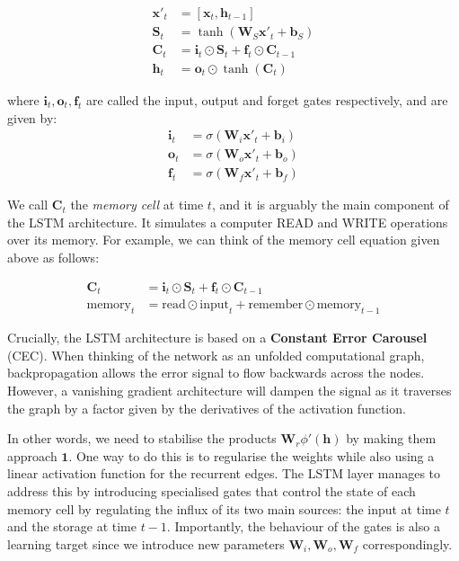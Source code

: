 \documentclass[pdftex,11pt,a4paper]{article}
\theoremstyle{definition}
\theoremstyle{remark}
\newcommand*{\V}[1]{\mathbf{#1}}%
\begin{document}
\begin{align*}
    \V{x}'_t &= [ \V{x}_t, \V{h}_{t-1} ]\\
    \V{S}_t &= \tanh(\V{W}_S\V{x}'_t + \V{b}_S)\\
    \V{C}_t &= \V{i}_t\odot\V{S}_t + \V{f}_t\odot\V{C}_{t-1}\\
    \V{h}_t &= \V{o}_t \odot \tanh(\V{C}_t)
\end{align*}
\par where $\V{i}_t, \V{o}_t, \V{f}_t$ are called the input, output and forget gates respectively, and are given by:
\begin{align*}
    \V{i}_t &= \sigma(\V{W}_i\V{x}'_t + \V{b}_i)\\
    \V{o}_t &= \sigma(\V{W}_o\V{x}'_t + \V{b}_o)\\
    \V{f}_t &= \sigma(\V{W}_f\V{x}'_t + \V{b}_f)
\end{align*}

\par We call $\V{C}_t$ the \textit{memory cell} at time $t$, and it is arguably the main component of the LSTM architecture. It simulates a computer READ and WRITE operations over its memory. For example, we can think of the memory cell equation given above as follows:

\begin{align*}
    \V{C}_t &= \V{i}_t\odot\V{S}_t + \V{f}_t\odot\V{C}_{t-1}\\
    \text{memory}_t &= \text{read}\odot\text{input}_t + \text{remember}\odot\text{memory}_{t-1}
\end{align*}

\par Crucially, the LSTM architecture is based on a \textbf{Constant Error Carousel} (CEC). When thinking of the network as an unfolded computational graph, backpropagation allows the error signal to flow backwards across the nodes. However, a vanishing gradient architecture will dampen the signal as it traverses the graph by a factor given by the derivatives of the activation function. 

\par In other words, we need to stabilise the products $\V{W}_r\phi'{(\V{h})}$ by making them approach $\V{1}$. One way to do this is to regularise the weights while also using a linear activation function for the recurrent edges.  The LSTM layer manages to address this by introducing specialised gates that control the state of each memory cell by regulating the influx of its two main sources: the input at time $t$ and the storage at time $t-1$. Importantly, the behaviour of the gates is also a learning target since we introduce new parameters $\V{W}_i, \V{W}_o, \V{W}_f$ correspondingly.  
\end{document}
